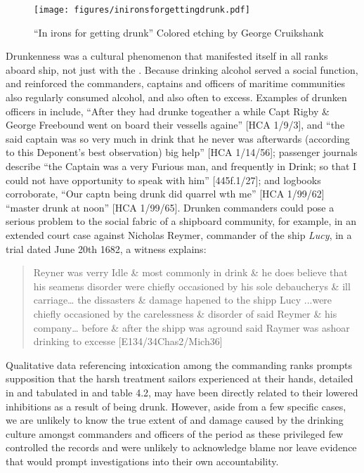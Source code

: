  
\begin{figure}
\texttt{[image: figures/inironsforgettingdrunk.pdf]}
\caption{\label{fig:key:4.4} “In irons for getting drunk” Colored etching by George Cruikshank}
\end{figure}

Drunkenness was a cultural phenomenon that manifested itself in all ranks aboard ship, not just with the . Because drinking alcohol served a social function, and reinforced  \citep[13,]{Fury2015} the commanders, captains and officers of maritime communities also regularly consumed alcohol, and also often to excess. Examples of drunken officers in  include, “After they had drunke togeather a while Capt Rigby \& George Freebound went on board their vessells againe” [HCA 1/9/3], and “the said captain was so very much in drink that he never was afterwards (according to this Deponent’s best observation) big help” [HCA 1/14/56]; passenger journals describe “the Captain was a very Furious man, and frequently in Drink; so that I could not have opportunity to speak with him” [445f.1/27]; and logbooks corroborate, “Our captn being drunk did quarrel wth me” [HCA 1/99/62] “master drunk at noon” [HCA 1/99/65]. Drunken commanders could pose a serious problem to the social fabric of a shipboard community, for example, in an extended court case against Nicholas Reymer, commander of the ship \textit{Lucy}, in a trial dated June 20th 1682, a witness explains:

\begin{quotation}
Reyner was verry Idle \& most commonly in drink \& he does believe that his seamens disorder were chiefly occasioned by his sole debaucherys \& ill carriage… the dissasters \& damage hapened to the shipp Lucy ...were chiefly occasioned by the carelessness \& disorder of said Reymer \& his company… before \& after the shipp was aground said Raymer was ashoar drinking to excesse  [E134/34Chas2/Mich36]
\end{quotation}

Qualitative data referencing intoxication among the commanding ranks prompts supposition that the harsh treatment sailors experienced at their hands, detailed in  and tabulated in  and table 4.2, may have been directly related to their lowered inhibitions as a result of being drunk. However, aside from a few specific cases, we are unlikely to know the true extent of and damage caused by the drinking culture amongst commanders and officers of the period as these privileged few controlled the records and were unlikely to acknowledge blame nor leave evidence that would prompt investigations into their own accountability.

